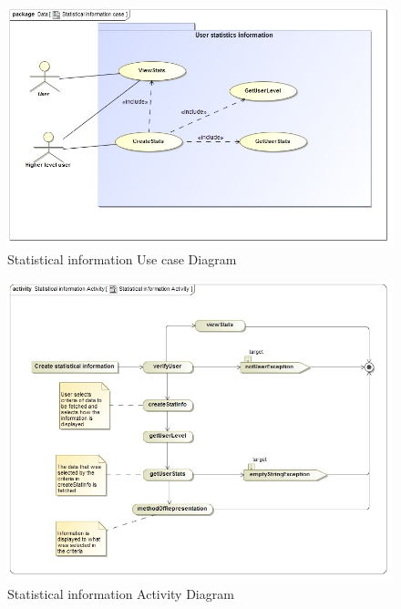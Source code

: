 \documentclass[11pt]{article}
\begin{document}
\begin{enumerate}
\begin{itemize}
\end{itemize}

\graphicspath{ {../Diagrams/Matt/Case/} }
	  \begin{figure}[H]	
    	\includegraphics[scale=0.5]{StatisticalinformationCase.jpg}
    	\caption{Statistical information Use case Diagram}
	\end{figure}

\graphicspath{ {../Diagrams/Matt/Activity/} }
	  \begin{figure}[H]	
    	\includegraphics[scale=0.5]{Statisticalinformation.jpg}
    	\caption{Statistical information Activity Diagram}
	\end{figure}
	

\end{enumerate}
\end{document}
